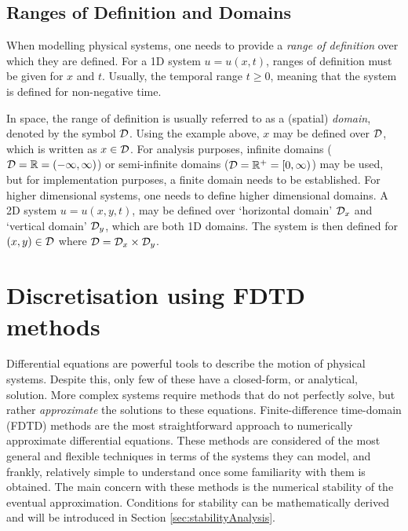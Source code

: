 
\subsection{Ranges of Definition and Domains}\label{sec:domains}
When modelling physical systems, one needs to provide a \textit{range of definition} over which they are defined. For a 1D system $u = u(x,t)$, ranges of definition must be given for $x$ and $t$. Usually, the temporal range $t\geq 0$, meaning that the system is defined for non-negative time. 

In space, the range of definition is usually referred to as a (spatial) \textit{domain}, denoted by the symbol $\mathcal{D}$. Using the example above, $x$ may be defined over $\mathcal{D}$, which is written as $x\in \mathcal{D}$. For analysis purposes, infinite domains ($\mathcal{D} = \mathbb{R} = (-\infty, \infty)$) or semi-infinite domains ($\mathcal{D} = \mathbb{R}^+ = [0, \infty)$) may be used, but for implementation purposes, a finite domain needs to be established. For higher dimensional systems, one needs to define higher dimensional domains. A 2D system $u=u(x,y,t)$, may be defined over `horizontal domain' $\mathcal{D}_x$ and `vertical domain' $\mathcal{D}_y$, which are both 1D domains. The system is then defined for $(x,y)\in \mathcal{D}$ where $\mathcal{D} = \mathcal{D}_x\times \mathcal{D}_y$. 

\section{Discretisation using FDTD methods}\label{sec:discUsingFDTD}
Differential equations are powerful tools to describe the motion of physical systems. Despite this, only few of these have a closed-form, or analytical, solution. More complex systems require methods that do not perfectly solve, but rather \textit{approximate} the solutions to these equations. Finite-difference time-domain (FDTD) methods are the most straightforward approach to numerically approximate differential equations. These methods are considered of the most general and flexible techniques in terms of the systems they can model, and frankly, relatively simple to understand once some familiarity with them is obtained. The main concern with these methods is the numerical stability of the eventual approximation. Conditions for stability can be mathematically derived and will be introduced in Section \ref{sec:stabilityAnalysis}.


